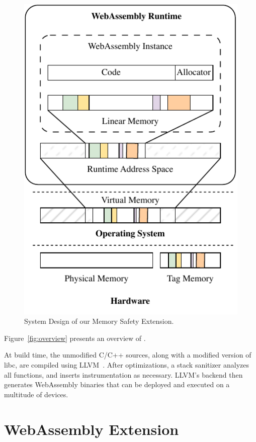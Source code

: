 \begin{figure}[t]
    \centering
    \includegraphics[scale=1]{figures/build/system-design-2}
    \caption{System Design of our Memory Safety Extension.}
    \label{fig:system-design-2}
\end{figure}

Figure~\ref{fig:overview} presents an overview of \projectname{}.

At build time, the unmodified C/C++ sources, along with a modified version of libc, are compiled using LLVM~\cite{lattner2004llvm}.
After optimizations, a stack sanitizer analyzes all functions, and inserts instrumentation as necessary.
LLVM's backend then generates WebAssembly binaries that can be deployed and executed on a multitude of devices.

\section{WebAssembly Extension}
\label{sec:wasm-extension}

